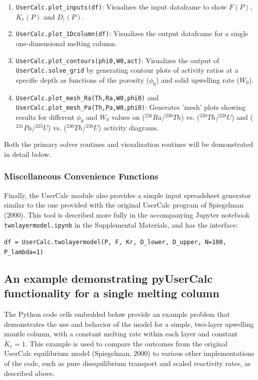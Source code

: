 \documentclass[draft]{agujournal2019}
\begin{document}
\begin{enumerate}
	\item \colorbox{gray!20}{\texttt{UserCalc.plot\_inputs(df)}}: Visualizes the input dataframe to show $F(P)$, $K_r(P)$ and $D_i(P)$.
	\item \colorbox{gray!20}{\texttt{UserCalc.plot\_1Dcolumn(df)}}: Visualizes the output dataframe for a single one-dimensional melting column.
	\item \colorbox{gray!20}{\texttt{UserCalc.plot\_contours(phi0,W0,act)}}: Visualizes the output of \colorbox{gray!20}{\texttt{UserCalc.solve\_grid}} by generating contour plots of activity ratios at a specific depth as functions of the porosity ($\phi_0$) and solid upwelling rate ($W_0$).
	\item \colorbox{gray!20}{\texttt{UserCalc.plot\_mesh\_Ra(Th,Ra,W0,phi0)}} and \colorbox{gray!20}{\texttt{UserCalc.plot\_mesh\_Pa(Th,Pa,W0,phi0)}}: Generates 'mesh' plots showing results for different $\phi_0$ and $W_0$ values on ($^{226}Ra$/$^{230}Th$) vs. ($^{230}Th$/$^{238}U$) and ($^{231}Pa$/$^{235}U$) vs. ($^{230}Th$/$^{238}U$) activity diagrams.
\end{enumerate}

Both the primary solver routines and visualization routines will be demonstrated in detail below.


\subsubsection{Miscellaneous Convenience Functions}

Finally, the UserCalc module also provides a simple input spreadsheet generator similar to the one provided with the original UserCalc program of Spiegelman (2000). This tool is described more fully in the accompanying Jupyter notebook \colorbox{gray!20}{\texttt{twolayermodel.ipynb}} in the Supplemental Materials, and has the interface:

	\colorbox{gray!20}{\texttt{df = UserCalc.twolayermodel(P, F, Kr, D\_lower, D\_upper, N=100, P\_lambda=1)}}


\subsection{An example demonstrating pyUserCalc functionality for a single melting column}

The Python code cells embedded below provide an example problem that demonstrates the use and behavior of the model for a simple, two-layer upwelling mantle column, with a constant melting rate within each layer and constant $K_r=1$. This example is used to compare the outcomes from the original UserCalc equilibrium model (Spiegelman, 2000) to various other implementations of the code, such as pure disequilibrium transport and scaled reactivity rates, as described above.
\end{document}
